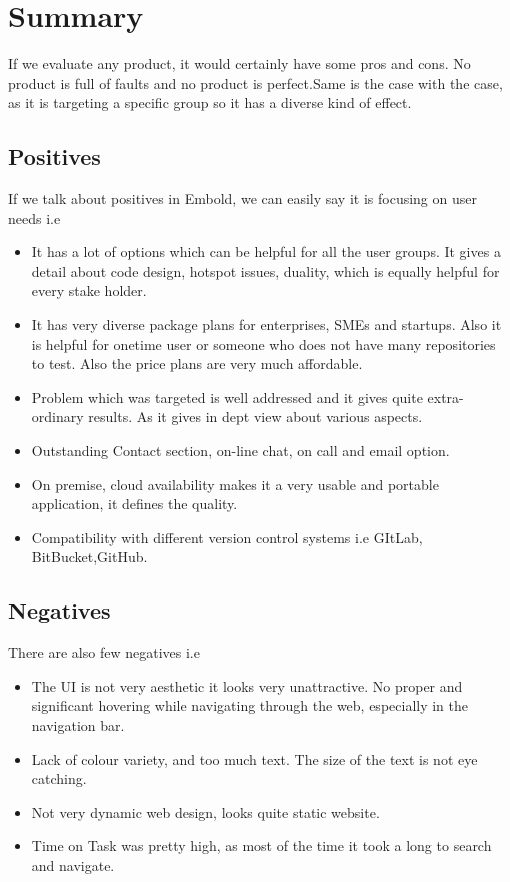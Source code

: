 \section{Summary}
If we evaluate any product, it would certainly have some pros and cons. No product is full of faults and no product is perfect.Same is the case with the case, as it is targeting a specific group so it has a diverse kind of effect. 
\subsection{Positives}
If we talk about positives in Embold, we can easily say it is focusing on user needs i.e
\begin{itemize}
\item It has a lot of options which can be helpful for all the user groups. It gives a detail about code design, hotspot issues, duality, which is equally helpful for every stake holder. 
\item It has very diverse package plans for enterprises, SMEs and startups. Also it is helpful for onetime user or someone who does not have many repositories to test. Also the price plans are very much affordable. 
\item Problem which was targeted is well addressed and it gives quite extra-ordinary results. As it gives in dept view about various aspects.
\item Outstanding Contact section, on-line chat, on call and email option.
\item On premise, cloud availability makes it a very usable and portable application, it defines the quality. 
\item Compatibility with different version control systems i.e GItLab, BitBucket,GitHub.
\end{itemize}
\subsection{Negatives}
There are also few negatives i.e
\begin{itemize}
\item The UI is not very aesthetic it looks very unattractive. No proper and significant hovering while navigating through the web, especially in the navigation bar.
\item  Lack of colour variety, and too much text. The size of the text is not eye catching. 
\item Not very dynamic web design, looks quite static website. 
\item Time on Task was pretty high, as most of the time it took a long to search and navigate. 

\end{itemize}
